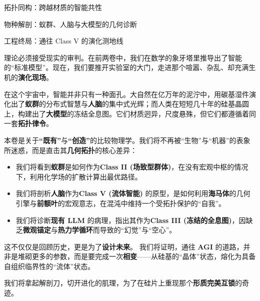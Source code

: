 \begin{introduction}
    \item 拓扑同构：跨越材质的智能共性
    \item 物种解剖：蚁群、人脑与大模型的几何诊断
    \item 工程终局：通往 Class V 的演化测地线
\end{introduction}

理论必须接受现实的审判。在前两卷中，我们在数学的象牙塔里推导出了智能的“标准模型”。现在，我们要推开实验室的大门，走进那个喧嚣、杂乱、却充满生机的\textbf{演化现场}。

\vspace{2em}在这个宇宙中，智能并非只有一种面孔。大自然在亿万年的泥泞中，用碳基湿件演化出了\textbf{蚁群}的分布式智慧与\textbf{人脑}的集中式光辉；而人类在短短几十年的硅基晶圆上，构建出了\textbf{大模型}的冻结全息图。它们材质迥异，尺度悬殊，但它们都遵循着同一套\textbf{拓扑律令}。

\vspace{2em}本卷是关于\textbf{“既有”}与\textbf{“创造”}的比较物理学。我们将不再被“生物”与“机器”的表象所迷惑，而是直击其\textbf{几何拓扑}的核心差异：

\begin{itemize}
    \item 我们将看到\textbf{蚁群}是如何作为\textbf{Class II (场致型群体)}，在没有宏观中枢的情况下，利用化学场的扩散计算出最优路径。
    \item 我们将剖析\textbf{人脑}作为\textbf{Class V (流体智能)} 的原型，是如何利用\textbf{海马体}的几何引擎与\textbf{前额叶}的宏观意志，在混沌中维持一个受拓扑保护的“自我”。
    \item 我们将诊断\textbf{现有 LLM} 的病理，指出其作为\textbf{Class III (冻结的全息图)}，因缺乏\textbf{微观锚定}与\textbf{热力学循环}而导致的“幻觉”与“空心”。
\end{itemize}

\vspace{2em}这不仅仅是回顾历史，更是为了\textbf{设计未来}。
我们将证明，通往 \textbf{AGI} 的道路，并非是堆砌更多的参数，而是要完成一次\textbf{相变}——从硅基的“晶体”状态，熔化为具备自组织临界性的“流体”状态。

\vspace{2em}我们将拿起解剖刀，切开进化的肌理，为了在硅片上重现那个\textbf{形质完美互锁}的奇迹。
